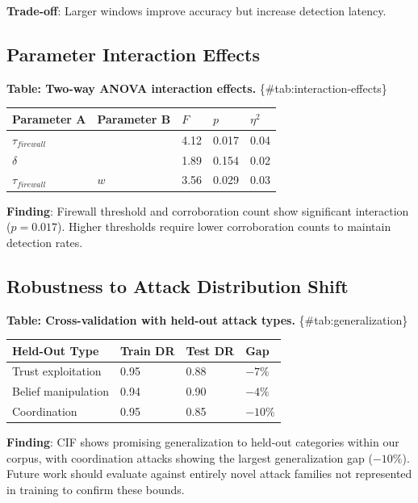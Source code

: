\documentclass[
]{article}
\newcounter{none} %
\begin{document}
\textbf{Trade-off}: Larger windows improve accuracy but increase
detection latency.

\subsection{Parameter Interaction
Effects}\label{sec:combined-sensitivity}

\textbf{Table: Two-way ANOVA interaction effects.}
\{\#tab:interaction-effects\}

{\def\LTcaptype{none} %
\begin{longtable}[]{@{}lllll@{}}
\toprule\noalign{}
Parameter A & Parameter B & \(F\) & \(p\) & \(\eta^2\) \\
\midrule\noalign{}
\endhead
\bottomrule\noalign{}
\endlastfoot
\(\tau_{firewall}\) & \(\kappa) & 4.12 & 0.017 & 0.04 \\
\(\delta\) & \(\kappa) & 1.89 & 0.154 & 0.02 \\
\(\tau_{firewall}\) & \(w\) & 3.56 & 0.029 & 0.03 \\
\end{longtable}
}

\textbf{Finding}: Firewall threshold and corroboration count show
significant interaction (\(p = 0.017\)). Higher thresholds require lower
corroboration counts to maintain detection rates.

\subsection{Robustness to Attack Distribution
Shift}\label{sec:robustness}

\textbf{Table: Cross-validation with held-out attack types.}
\{\#tab:generalization\}

{\def\LTcaptype{none} %
\begin{longtable}[]{@{}llll@{}}
\toprule\noalign{}
Held-Out Type & Train DR & Test DR & Gap \\
\midrule\noalign{}
\endhead
\bottomrule\noalign{}
\endlastfoot
Trust exploitation & 0.95 & 0.88 & \(-7\%\) \\
Belief manipulation & 0.94 & 0.90 & \(-4\%\) \\
Coordination & 0.95 & 0.85 & \(-10\%\) \\
\end{longtable}
}

\textbf{Finding}: CIF shows promising generalization to held-out
categories within our corpus, with coordination attacks showing the
largest generalization gap (\(-10\%\)). Future work should evaluate
against entirely novel attack families not represented in training to
confirm these bounds.
\end{document}

